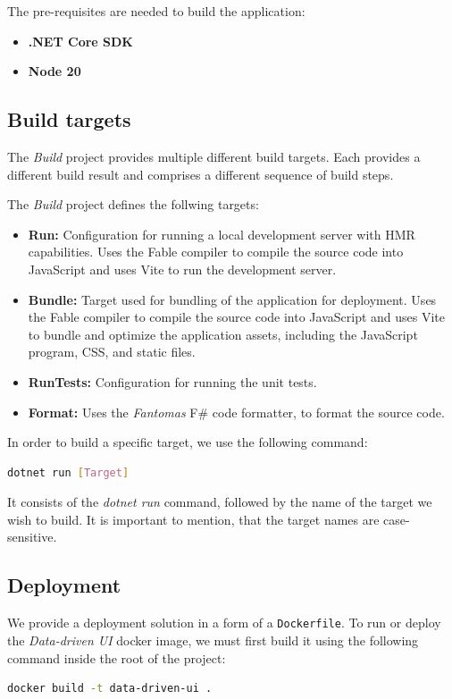 The pre-requisites are needed to build the application:
\begin{itemize}
	\item \textbf{.NET Core SDK}
	\item \textbf{Node 20}
\end{itemize}

\subsection{Build targets}
The \emph{Build} project provides multiple different build targets.
Each provides a different build result and comprises a different sequence of build steps.

The \emph{Build} project defines the follwing targets:
\begin{itemize}
	\item \textbf{Run:} Configuration for running a local development server with HMR capabilities.
	      Uses the Fable compiler to compile the source code into JavaScript and uses Vite to run the development server.
	\item \textbf{Bundle:} Target used for bundling of the application for deployment.
	      Uses the Fable compiler to compile the source code into JavaScript and uses Vite to
	      bundle and optimize the application assets, including the JavaScript program, CSS, and static files.
	\item \textbf{RunTests:} Configuration for running the unit tests.
	\item \textbf{Format:} Uses the \emph{Fantomas} F\# code formatter, to format the source code.
\end{itemize}
In order to build a specific target, we use the following command:
\begin{lstlisting}[language=bash]
  dotnet run [Target] 
\end{lstlisting}
It consists of the \emph{dotnet run} command, followed by the name of the target we wish to build.
It is important to mention, that the target names are case-sensitive.

\subsection{Deployment}
We provide a deployment solution in a form of a \texttt{Dockerfile}.
To run or deploy the \emph{Data-driven UI} docker image, we must first build it using the following command inside the root of the project:
\begin{lstlisting}[language=bash]
  docker build -t data-driven-ui .  
\end{lstlisting}

